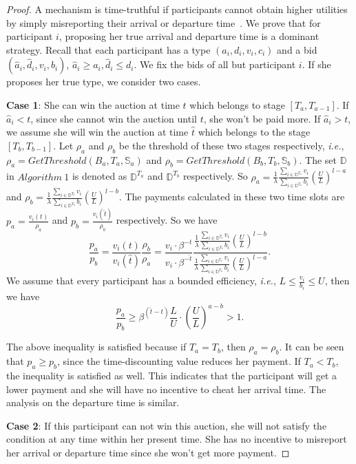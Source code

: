 \documentclass[conference,compsocconf,letterpaper,10pt]{IEEEtran}
\newcommand{\ie}{{\em i.e.}}
\begin{document}
\begin{proof}
A mechanism is time-truthful if participants cannot
obtain higher utilities by simply misreporting their arrival or departure time~\cite{zhao2014crowdsource}. We prove that for participant $i$, proposing her true arrival and departure time is a dominant strategy. Recall that each participant has a type $(a_i,d_i,v_i,c_i)$ and a bid $(\hat{a}_i,\hat{d}_i, v_i,b_i)$, $\hat{a}_i\ge a_i, \hat{d}_i\le d_i$. We fix the bids of all but participant $i$. If she proposes her true type, we consider two cases.

\textbf{Case 1}: She can win the auction  at time $t$ which belongs to  stage $[T_a,T_{a-1}]$. If $\hat{a}_i<t$, since she cannot win the auction until $t$, she won't be paid more. If $\hat{a}_i>t$, we assume she will win the auction at time $\hat{t}$ which belongs to the stage $[T_b,T_{b-1}]$. Let $\rho_a$ and $\rho_b$ be the threshold of these two stages respectively, \ie, $\rho_a=GetThreshold(B_a,T_a,\mathbb{S}_a)$ and $\rho_b=GetThreshold(B_b,T_b,\mathbb{S}_b)$. The set $\mathbb{D}$ in $Algorithm\ 1$ is denoted as $\mathbb{D}^{T_a}$ and $\mathbb{D}^{T_b}$ respectively. So $\rho_a =\frac{1}{\lambda}\frac{\sum_{i\in\mathbb{D}^{T_a}}v_i}{\sum_{i\in\mathbb{D}^{T_a}}b_i}\left(\frac{U}{L}\right)^{l-a}$ and $\rho_b =\frac{1}{\lambda}\frac{\sum_{i\in\mathbb{D}^{T_b}}v_i}{\sum_{i\in\mathbb{D}^{T_b}}b_i}\left(\frac{U}{L}\right)^{l-b}$. The payments calculated in these two time slots are $p_a=\frac{v_i(t)}{\rho_a}$ and $p_b=\frac{v_i(\hat{t})}{\rho_b}$ respectively. So we have
\begin{equation}
\frac{p_a}{p_b}=\frac{v_i(t)}{v_i(\hat{t})}\frac{\rho_b}{\rho_a}=\frac{v_i \cdot \beta^{-t}}{v_i \cdot \beta^{-\hat{t}}}\frac{\frac{1}{\lambda}\frac{\sum_{i\in\mathbb{D}^{T_b}}v_i}{\sum_{i\in\mathbb{D}^{T_b}}b_i}\left(\frac{U}{L}\right)^{l-b}}{\frac{1}{\lambda}\frac{\sum_{i\in\mathbb{D}^{T_a}}v_i}{\sum_{i\in\mathbb{D}^{T_a}}b_i}\left(\frac{U}{L}\right)^{l-a}}.
\end{equation}
We assume that every participant has a bounded efficiency, \ie, $L \le \frac{v_i}{b_i} \le U$, then we have
\begin{equation}
\frac{p_a}{p_b} \ge \beta^{(\hat{t}-t)} \frac{L}{U}  \cdot \left(\frac{U}{L}\right)^{a-b} > 1.
\end{equation}

The above inequality is satisfied because if $T_a=T_b$, then $\rho_a=\rho_b$. It can be seen that $p_a \ge p_b$, since the time-discounting value reduces her payment. If $T_a < T_b$, the inequality is satisfied as well. This indicates that the participant will get a lower payment and she will have no incentive to cheat her arrival time. The analysis on the departure time is similar.

\textbf{Case 2}: If this participant can not win this auction, she will not satisfy the condition at any time within her present time. She has no incentive to misreport her arrival or departure time since she won't get more payment.
\end{proof}
\end{document}
